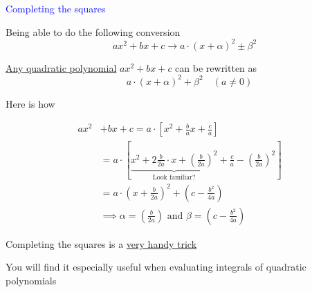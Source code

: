 \documentclass[14pt,fleqn]{extarticle}
\begin{document}
 
\begin{skill}
\textcolor{blue}{Completing the squares}

Being able to do the following conversion
\small\[ \quad ax^2 + bx + c \longrightarrow a\cdot \left(x + \alpha \right)^2 \pm \beta^2 \]\normalsize 
\end{skill}

\newcard 

\underline{Any quadratic polynomial} $ax^2 + bx + c$ can be rewritten as 
\[ \qquad a\cdot \left(x + \alpha \right)^2 + \beta^2\quad \left(a \neq 0 \right)\] 

Here is how 

\begin{align}
	ax^2 &+ bx + c = a\cdot \left[x^2 + \frac{b}{a} x + \frac{c}{a} \right] \\
	&= a\cdot \left[\underbrace{x^2 + 2\frac{b}{2a}\cdot x + \left(\frac{b}{2a} \right)^2}_{\text{Look familiar?}} +  \frac{c}{a} - \left(\frac{b}{2a} \right)^2  \right] \\
	&= a\cdot \left(x + \frac{b}{2a} \right)^2 + \left(c-\frac{b^2}{4a} \right) \\
	&\implies \alpha = \left(\frac{b}{2a} \right)\text{ and } \beta = \left(c-\frac{b^2}{4a} \right)
\end{align}


Completing the squares is a \underline{very handy trick}\newline 

You will find it especially useful when evaluating integrals of quadratic polynomials 
\end{document}
